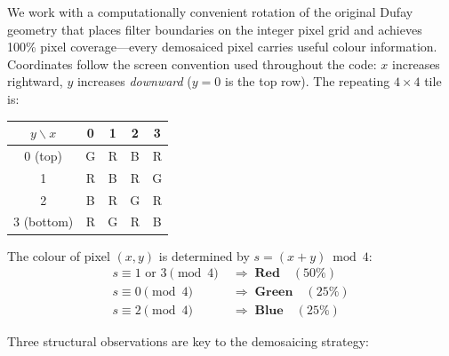 \documentclass[a4paper,11pt]{article}
\newcommand{\tile}[6][]{%
  \if#4r\def\tilecol{cfared}\else
    \if#4g\def\tilecol{cfagreen}\else
      \if#4b\def\tilecol{cfablue}\else
        \def\tilecol{cfagrey}\fi\fi\fi
  \node[cfa-tile, fill=\tilecol!60, #1] (T#2#3) at (#2*0.8, -#3*0.8) {};
  \ifx&#5&\else\node[cfa-coords, above=0pt of T#2#3] {#5};\fi
  \ifx&#6&\else\node[cfa-weight] at (T#2#3) {#6};\fi
}
\newcommand{\dufaytile}[5][]{%
  \pgfmathtruncatemacro{\cfas}{mod(int(#2)+int(#3),4)}%
  \ifcase\cfas\tile[#1]{#2}{#3}{g}{#4}{#5}%
  \or\tile[#1]{#2}{#3}{r}{#4}{#5}%
  \or\tile[#1]{#2}{#3}{b}{#4}{#5}%
  \or\tile[#1]{#2}{#3}{r}{#4}{#5}\fi
}
\begin{document}
We work with a computationally convenient rotation of the original
Dufay geometry that places filter boundaries on the integer pixel grid
and achieves 100\% pixel coverage---every demosaiced pixel carries
useful colour information.  Coordinates follow the screen convention
used throughout the code: $x$ increases rightward, $y$ increases
\emph{downward} ($y=0$ is the top row).  The repeating $4\times4$ tile is:

\begin{center}
\begin{small}
\begin{tabular}{c|cccc}
$y\backslash x$ & 0 & 1 & 2 & 3 \\\hline
0 (top)    & G & R & B & R \\
1          & R & B & R & G \\
2          & B & R & G & R \\
3 (bottom) & R & G & R & B \\
\end{tabular}
\end{small}
\end{center}


\begin{center}
\end{center}

The colour of pixel $(x,y)$ is determined by $s = (x+y)\bmod 4$:
\begin{align}
  s \equiv 1 \text{ or } 3 \pmod{4} &\;\Rightarrow\; \textbf{Red}\quad   (50\%)\label{eq:red}\\
  s \equiv 0 \pmod{4}               &\;\Rightarrow\; \textbf{Green}\quad  (25\%)\label{eq:green}\\
  s \equiv 2 \pmod{4}               &\;\Rightarrow\; \textbf{Blue}\quad   (25\%)\label{eq:blue}
\end{align}

Three structural observations are key to the demosaicing strategy:
\end{document}
